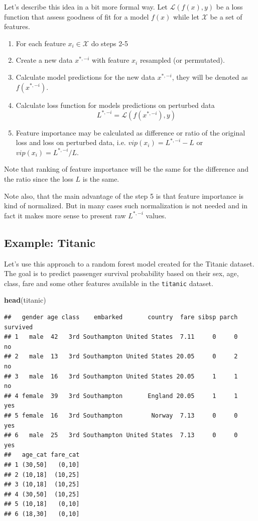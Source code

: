 \documentclass[12pt,]{krantz}
\newenvironment{Shaded}{\begin{snugshade}}{\end{snugshade}}
\newcommand{\KeywordTok}[1]{\textcolor[rgb]{0.13,0.29,0.53}{\textbf{#1}}}
\newcommand{\NormalTok}[1]{#1}
\providecommand{\tightlist}{%
  \setlength{\itemsep}{0pt}\setlength{\parskip}{0pt}}
\theoremstyle{definition}
\theoremstyle{definition}
\theoremstyle{definition}
\theoremstyle{remark}
\begin{document}
Let's describe this idea in a bit more formal way. Let
\(\mathcal L(f(x), y)\) be a loss function that assess goodness of fit
for a model \(f(x)\) while let \(\mathcal X\) be a set of features.

\begin{enumerate}
\def\labelenumi{\arabic{enumi}.}
\tightlist
\item
  For each feature \(x_i \in \mathcal X\) do steps 2-5
\item
  Create a new data \(x^{*,-i}\) with feature \(x_i\) resampled (or
  permutated).
\item
  Calculate model predictions for the new data \(x^{*,-i}\), they will
  be denoted as \(f(x^{*,-i})\).
\item
  Calculate loss function for models predictions on perturbed data \[
  L^{*,-i} = \mathcal L(f(x^{*,-i}), y)
  \]
\item
  Feature importance may be calculated as difference or ratio of the
  original loss and loss on perturbed data, i.e.
  \(vip(x_i) = L^{*,-i} - L\) or \(vip(x_i) = L^{*,-i} / L\).
\end{enumerate}

Note that ranking of feature importance will be the same for the
difference and the ratio since the loss \(L\) is the same.

Note also, that the main advantage of the step 5 is that feature
importance is kind of normalized. But in many cases such normalization
is not needed and in fact it makes more sense to present raw
\(L^{*,-i}\) values.

\hypertarget{example-titanic-1}{%
\subsection{Example: Titanic}\label{example-titanic-1}}

Let's use this approach to a random forest model created for the Titanic
dataset. The goal is to predict passenger survival probability based on
their sex, age, class, fare and some other features available in the
\texttt{titanic} dataset.

\begin{Shaded}
\begin{Highlighting}[]
\KeywordTok{head}\NormalTok{(titanic)}
\end{Highlighting}
\end{Shaded}

\begin{verbatim}
##   gender age class    embarked       country  fare sibsp parch survived
## 1   male  42   3rd Southampton United States  7.11     0     0       no
## 2   male  13   3rd Southampton United States 20.05     0     2       no
## 3   male  16   3rd Southampton United States 20.05     1     1       no
## 4 female  39   3rd Southampton       England 20.05     1     1      yes
## 5 female  16   3rd Southampton        Norway  7.13     0     0      yes
## 6   male  25   3rd Southampton United States  7.13     0     0      yes
##   age_cat fare_cat
## 1 (30,50]   (0,10]
## 2 (10,18]  (10,25]
## 3 (10,18]  (10,25]
## 4 (30,50]  (10,25]
## 5 (10,18]   (0,10]
## 6 (18,30]   (0,10]
\end{verbatim}
\end{document}
